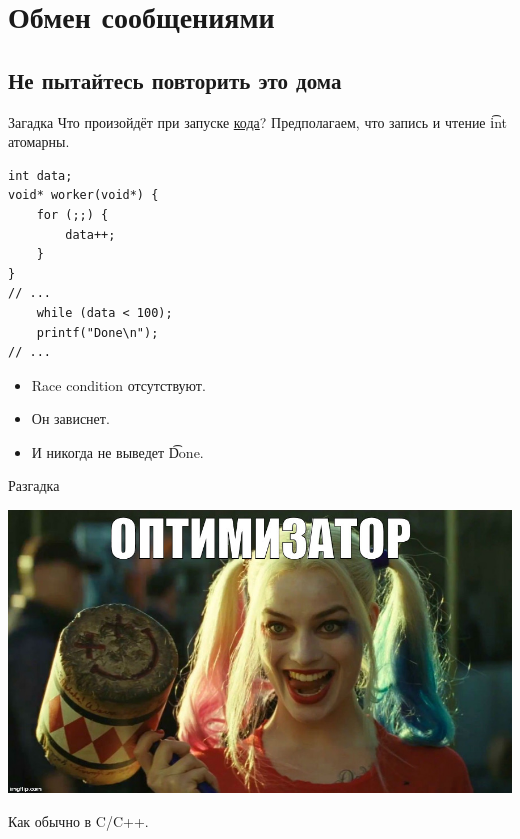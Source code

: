 \section{Обмен сообщениями}
\subsection{Не пытайтесь повторить это дома}

\begin{frame}
\end{frame}

\begin{frame}[fragile]{Загадка}
	Что произойдёт при запуске \href{https://raw.githubusercontent.com/yeputons/spring-2019-paradigms/master/190410/sources/12-optimizer.cpp}{кода}?
	Предполагаем, что запись и чтение \t{int} атомарны.
\begin{verbatim}
int data;
void* worker(void*) {
    for (;;) {
        data++;
    }
}
// ...
    while (data < 100);
    printf("Done\n");
// ...
\end{verbatim}
	\begin{itemize}
		\pause\item Race condition отсутствуют.
		\pause\item Он зависнет.
		\pause\item И никогда не выведет \t{Done}.
	\end{itemize}
\end{frame}

\begin{frame}{Разгадка}
	\begin{center}
		\includegraphics[scale=0.3]{optimizer.jpg}
	\end{center}
	Как обычно в C/C++.
\end{frame}

